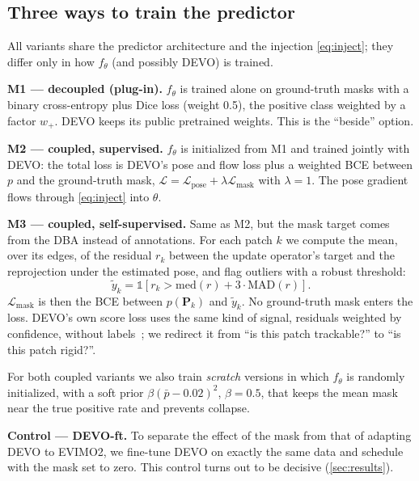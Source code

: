 \documentclass[conference]{IEEEtran}
\renewcommand{\mathbb}[1]{\mathds{#1}}
\newcommand{\wplus}{w_{+}}
\begin{document}
\subsection{Three ways to train the predictor}

All variants share the predictor architecture and the injection \cref{eq:inject}; they
differ only in how $f_\theta$ (and possibly DEVO) is trained.

\textbf{M1 --- decoupled (plug-in).} $f_\theta$ is trained alone on ground-truth masks
with a binary cross-entropy plus Dice loss (weight 0.5), the positive class weighted by a
factor $\wplus$. DEVO keeps its public pretrained weights. This is the ``beside'' option.

\textbf{M2 --- coupled, supervised.} $f_\theta$ is initialized from M1 and trained jointly
with DEVO: the total loss is DEVO's pose and flow loss plus a weighted BCE between $p$ and
the ground-truth mask,
$\mathcal{L} = \mathcal{L}_\text{pose} + \lambda \mathcal{L}_\text{mask}$ with
$\lambda = 1$. The pose gradient flows through \cref{eq:inject} into $\theta$.

\textbf{M3 --- coupled, self-supervised.} Same as M2, but the mask target comes from the
DBA instead of annotations. For each patch $k$ we compute the mean, over its edges, of the
residual $r_k$ between the update operator's target and the reprojection under the
estimated pose, and flag outliers with a robust threshold:
\begin{equation}
\tilde{y}_k = \mathbb{1}\left[r_k > \mathrm{med}(r) + 3 \cdot \mathrm{MAD}(r)\right].
\label{eq:selfsup}
\end{equation}
$\mathcal{L}_\text{mask}$ is then the BCE between $p(\mathbf{P}_k)$ and $\tilde{y}_k$. No
ground-truth mask enters the loss. DEVO's own score loss uses the same kind of signal,
residuals weighted by confidence, without labels~\cite{klenk2024devo}; we redirect it from
``is this patch trackable?'' to ``is this patch rigid?''.

For both coupled variants we also train \emph{scratch} versions in which $f_\theta$ is
randomly initialized, with a soft prior $\beta (\bar{p} - 0.02)^2$, $\beta = 0.5$, that
keeps the mean mask near the true positive rate and prevents collapse.

\textbf{Control --- DEVO-ft.} To separate the effect of the mask from that of adapting DEVO
to EVIMO2, we fine-tune DEVO on exactly the same data and schedule with the mask set to
zero. This control turns out to be decisive (\cref{sec:results}).
\end{document}
